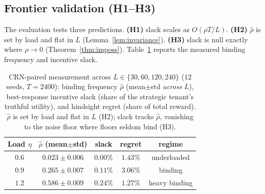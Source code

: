 \documentclass[conference]{IEEEtran}
\theoremstyle{definition}
\theoremstyle{remark}
\newcommand{\Slots}{T}
\newcommand{\Ep}{L}
\newcommand{\rhobind}{\rho}
\newcommand{\load}{\eta}
\begin{document}
\subsection{Frontier validation (H1--H3)}\label{sub:frontier}
The evaluation tests three predictions. \textbf{(H1)} slack scales as $O(\rhobind\Slots/\Ep)$. \textbf{(H2)} $\hat\rhobind$ is set by load and flat in $\Ep$ (Lemma~\ref{lem:invariance}). \textbf{(H3)} slack is null exactly where $\rhobind\to0$ (Theorem~\ref{thm:imposs}). Table~\ref{tab:frontier} reports the measured binding frequency and incentive slack.

\begin{table}[t]
\caption{CRN-paired measurement across $\Ep\!\in\!\{30,60,120,240\}$ ($12$ seeds, $\Slots{=}2400$): binding frequency $\hat\rhobind$ (mean$\pm$std \emph{across} $\Ep$), best-response incentive slack (share of the strategic tenant's truthful utility), and hindsight regret (share of total reward). $\hat\rhobind$ is set by load and flat in $\Ep$ (H2); slack tracks $\hat\rhobind$, vanishing to the noise floor where floors seldom bind (H3).}
\label{tab:frontier}
\centering
\small
\setlength{\tabcolsep}{4pt}
\begin{tabular}{@{}c c c c c@{}}
\toprule
Load $\load$ & $\hat\rhobind$ (mean$\pm$std) & slack & regret & regime \\
\midrule
$0.6$ & $0.023\pm0.006$ & $0.00\%$ & $1.43\%$ & underloaded \\
$0.9$ & $0.265\pm0.007$ & $0.11\%$ & $3.06\%$ & binding \\
$1.2$ & $0.586\pm0.009$ & $0.24\%$ & $1.27\%$ & heavy binding \\
\bottomrule
\end{tabular}
\end{table}
\end{document}
